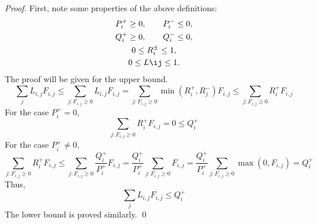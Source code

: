 \begin{proof}
   First, note some properties of the above definitions:
   \begin{gather*}
      P_i^+ \geq 0, \qquad P_i^- \leq 0,\\
      Q_i^+ \geq 0, \qquad Q_i^- \leq 0,\\
      0 \leq R_i^\pm \leq 1,\\
      0 \leq L\ij \leq 1.
   \end{gather*}
   The proof will be given for the upper bound.
   \[
      \sum\limits_j L_{i,j}F_{i,j}
         \leq \sum\limits_{j:F_{i,j}\geq 0} L_{i,j}F_{i,j}
         = \sum\limits_{j:F_{i,j}\geq 0} \min(R_i^+,R_j^-)F_{i,j}
         \leq \sum\limits_{j:F_{i,j}\geq 0} R_i^+ F_{i,j}
   \]
   For the case $P_i^+ = 0$,
   \[
      \sum\limits_{j:F_{i,j}\geq 0} R_i^+ F_{i,j} = 0 \leq Q_i^+
   \]
   For the case $P_i^+ \ne 0$,
   \[
      \sum\limits_{j:F_{i,j}\geq 0} R_i^+ F_{i,j}
      \leq \sum\limits_{j:F_{i,j}\geq 0}\frac{Q_i^+}{P_i^+} F_{i,j}
      = \frac{Q_i^+}{P_i^+} \sum\limits_{j:F_{i,j}\geq 0} F_{i,j}
      = \frac{Q_i^+}{P_i^+} \sum\limits_{j:F_{i,j}\geq 0} \max(0,F_{i,j})
      = Q_i^+
   \]
   Thus,
   \[
      \sum\limits_j L_{i,j}F_{i,j} \leq Q_i^+
   \]
   The lower bound is proved similarly.
   \qed
\end{proof}
